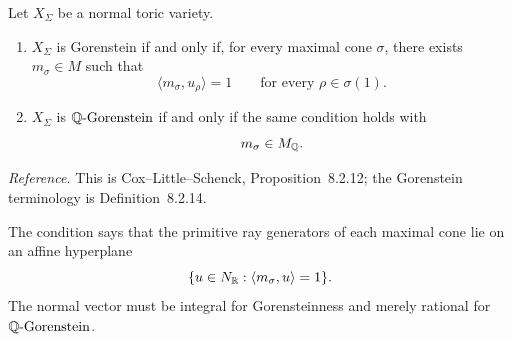 \begin{proposition}
\label{prop:gorenstein-height-one}
Let \(X_\Sigma\) be a normal toric variety.

\begin{enumerate}[label=(\alph*),wide=0pt]
\item \(X_\Sigma\) is Gorenstein if and only if, for every maximal
cone \(\sigma\), there exists \(m_\sigma\in M\) such that
\[
\langle m_\sigma,u_\rho\rangle=1
\qquad
\text{for every }\rho\in\sigma(1).
\]

\item \(X_\Sigma\) is \(\mathbb{Q}\text{-Gorenstein}\) if and only if the same
condition holds with
\[
m_\sigma\in M_{\mathbb{Q}}.
\]
\end{enumerate}
\end{proposition}

\noindent
\textit{Reference.}
This is Cox--Little--Schenck, Proposition~8.2.12; the Gorenstein
terminology is Definition~8.2.14.

The condition says that the primitive ray generators of each maximal
cone lie on an affine hyperplane
\[
\{u\in N_{\mathbb{R}}:\langle m_\sigma,u\rangle=1\}.
\]
The normal vector must be integral for Gorensteinness and merely
rational for \(\mathbb{Q}\text{-Gorenstein}\).

